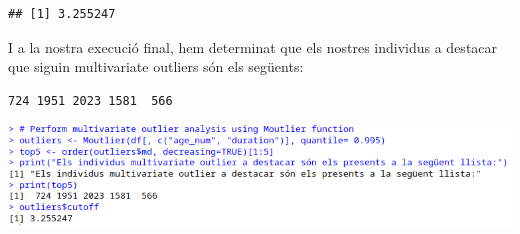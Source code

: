 \documentclass[
]{article}
\begin{document}
\begin{verbatim}
## [1] 3.255247
\end{verbatim}

I a la nostra execució final, hem determinat que els nostres individus a
destacar que siguin multivariate outliers són els següents:

\begin{verbatim}
724 1951 2023 1581  566
\end{verbatim}

\includegraphics{images/multivariate.png}
\end{document}
